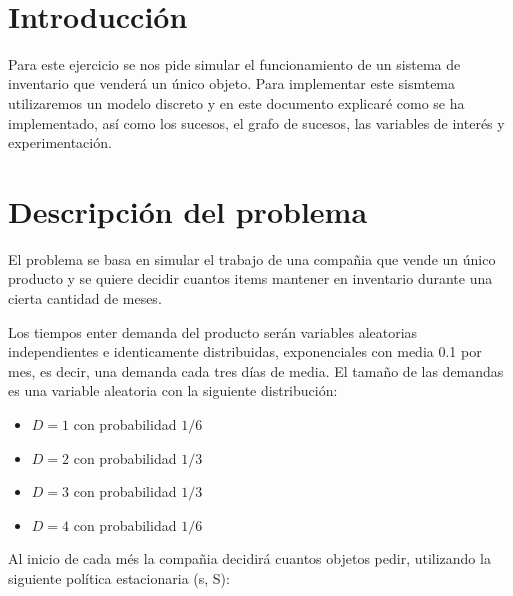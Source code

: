 \documentclass[12pt, spanish]{article}
\makeatletter
\let\thedate\@date
\makeatother
\begin{document}
\begin{titlepage}
    {\large \thedate}\\[0.5cm]
    {\doclicenseThis}

    \vfill

\end{titlepage}


\tableofcontents
\pagebreak



\section*{Introducción}

Para este ejercicio se nos pide simular el funcionamiento de un sistema de inventario que venderá un único objeto. Para implementar este sismtema utilizaremos un modelo discreto y en este documento explicaré como se ha implementado, así como los sucesos, el grafo de sucesos, las variables de interés y experimentación.

\section{Descripción del problema}

El problema se basa en simular el trabajo de una compañia que vende un único producto y se quiere decidir cuantos items mantener en inventario durante una cierta cantidad de meses.

Los tiempos enter demanda del producto serán variables aleatorias independientes e identicamente distribuidas, exponenciales con media 0.1 por mes, es decir, una demanda cada tres días de media. El tamaño de las demandas es una variable aleatoria con la siguiente distribución:

\begin{itemize}
	\item $D = 1$ con probabilidad $1/6$
	\item $D = 2$ con probabilidad $1/3$
	\item $D = 3$ con probabilidad $1/3$
	\item $D = 4$ con probabilidad $1/6$
\end{itemize}


Al inicio de cada més la compañia decidirá cuantos objetos pedir, utilizando la siguiente política estacionaria (s, S):
\end{document}

